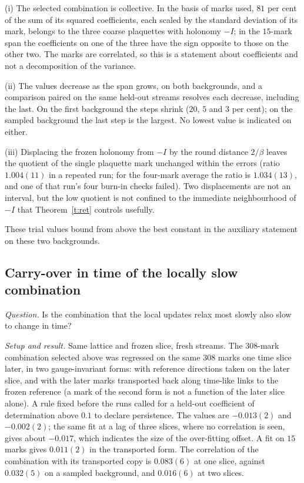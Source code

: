 (i) The selected combination is collective. In the basis of marks used, $81$ per cent of the sum of its
squared coefficients, each scaled by the standard deviation of its mark, belongs to the three coarse
plaquettes with holonomy $-I$; in the $15$-mark span the coefficients on one of the three have the sign
opposite to those on the other two. The marks are correlated, so
this is a statement about coefficients and not a decomposition of the variance.

(ii) The values decrease as the span grows, on both backgrounds, and a comparison paired on the same held-out
streams resolves each decrease, including the last. On the first background the steps shrink ($20$, $5$ and
$3$ per cent); on the sampled background the last step is the largest. No lowest value is indicated on
either.

(iii) Displacing the frozen holonomy from $-I$ by the round distance $2/\beta$ leaves the quotient of the
single plaquette mark unchanged within the errors (ratio $1.004(11)$ in a repeated run; for the four-mark
average the ratio is $1.034(13)$, and one of that run's four burn-in checks failed). Two displacements are
not an interval, but the low quotient is not confined to the immediate neighbourhood of $-I$ that
Theorem~\ref{t:ret} controls usefully.

These trial values bound from above the best constant in the auxiliary statement on these two backgrounds.

\subsection{Carry-over in time of the locally slow combination}\label{s:time}
\emph{Question.} Is the combination that the local updates relax most slowly also slow to change in time?

\emph{Setup and result.} Same lattice and frozen slice, fresh streams. The $308$-mark combination selected above was regressed on the
same $308$ marks one time slice later, in two gauge-invariant forms: with reference directions taken on the
later slice, and with the later marks transported back along time-like links to the frozen reference (a mark
of the second form is not a function of the later slice alone). A rule fixed before the runs called for a
held-out coefficient of determination above $0.1$ to declare persistence. The values are $-0.013(2)$ and
$-0.002(2)$; the same fit at a lag of three slices, where no correlation is seen, gives about $-0.017$, which
indicates the size of the over-fitting offset. A fit on $15$ marks gives $0.011(2)$ in the transported form.
The correlation of the combination with its transported copy is $0.083(6)$ at one slice, against $0.032(5)$ on
a sampled background, and $0.016(6)$ at two slices.

